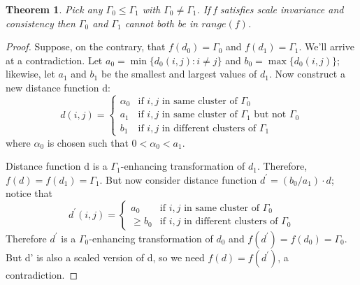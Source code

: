 \documentclass[letterpaper,10pt]{article}
\theoremstyle{definition}
\theoremstyle{plain}
\newtheorem{theorem}{Theorem}
\begin{document}

\begin{theorem}
Pick any $\Gamma_{0}\le\Gamma_{1}$ with $\Gamma_{0}\ne\Gamma_{1}$. If f satisfies scale invariance and consistency then $\Gamma_{0}$ and $\Gamma_{1}$ cannot both be in $range(f)$.
\end{theorem}
\begin{proof}
Suppose, on the contrary, that $f(d_{0})=\Gamma_{0}$ and $f(d_{1})=\Gamma_{1}$. We'll arrive at a contradiction.
Let $a_{0}=\min\{d_{0}(i,j):i\ne j\}$ and $b_{0}=\max\{d_{0}(i,j)\}$; likewise, let $a_{1}$ and $b_{1}$ be the smallest and largest values of $d_{1}$. Now construct a new distance function d:
\[
d(i,j) =
\begin{cases}
    \alpha_{0} & \text{if } i, j \text{ in same cluster of } \Gamma_{0} \\
    a_{1} & \text{if } i, j \text{ in same cluster of } \Gamma_{1} \text{ but not } \Gamma_{0} \\
    b_{1} & \text{if } i, j \text{ in different clusters of } \Gamma_{1}
\end{cases}
\]
where $\alpha_{0}$ is chosen such that $0 < \alpha_{0} < a_{1}$.

Distance function d is a $\Gamma_{1}$-enhancing transformation of $d_{1}$. Therefore, $f(d)=f(d_{1})=\Gamma_{1}$. But now consider distance function $d^{\prime}=(b_{0}/a_{1})\cdot d$; notice that
\[
d^{\prime}(i,j)=\begin{cases}
    a_{0} & \text{if } i,j \text{ in same cluster of } \Gamma_{0} \\
    \ge b_{0} & \text{if } i,j \text{ in different clusters of } \Gamma_{0}
\end{cases}
\]
Therefore $d^{\prime}$ is a $\Gamma_{0}$-enhancing transformation of $d_{0}$ and $f(d^{\prime})=f(d_{0})=\Gamma_{0}$. But d' is also a scaled version of d, so we need $f(d)=f(d^{\prime})$, a contradiction.
\end{proof}
\end{document}
